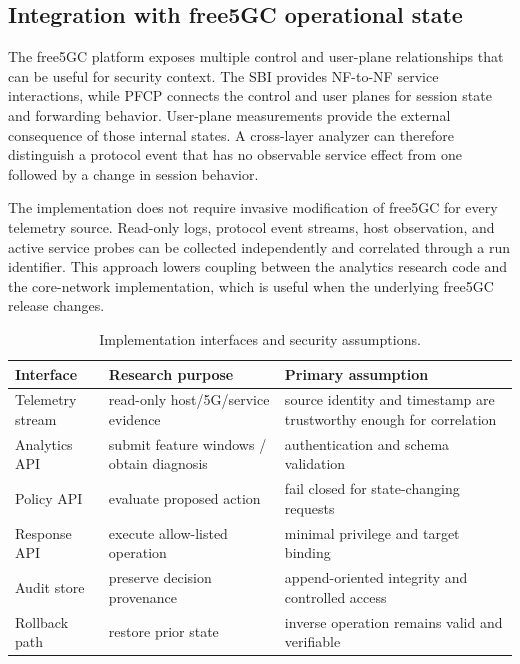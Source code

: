 \documentclass[sigconf,review]{acmart}
\begin{document}
\subsection{Integration with free5GC operational state}
The free5GC platform exposes multiple control and user-plane relationships that can be useful for security context. The SBI provides NF-to-NF service interactions, while PFCP connects the control and user planes for session state and forwarding behavior. User-plane measurements provide the external consequence of those internal states. A cross-layer analyzer can therefore distinguish a protocol event that has no observable service effect from one followed by a change in session behavior.

The implementation does not require invasive modification of free5GC for every telemetry source. Read-only logs, protocol event streams, host observation, and active service probes can be collected independently and correlated through a run identifier. This approach lowers coupling between the analytics research code and the core-network implementation, which is useful when the underlying free5GC release changes.

\begin{table}[t]
\caption{Implementation interfaces and security assumptions.}
\label{tab:interfaces}
\centering\scriptsize
\setlength{\tabcolsep}{2.5pt}
\renewcommand{\arraystretch}{1.08}
\begin{tabularx}{\columnwidth}{>{\raggedright\arraybackslash}p{} X X}
\toprule
Interface & Research purpose & Primary assumption \\
\midrule
Telemetry stream & read-only host/5G/service evidence & source identity and timestamp are trustworthy enough for correlation \\
Analytics API & submit feature windows / obtain diagnosis & authentication and schema validation \\
Policy API & evaluate proposed action & fail closed for state-changing requests \\
Response API & execute allow-listed operation & minimal privilege and target binding \\
Audit store & preserve decision provenance & append-oriented integrity and controlled access \\
Rollback path & restore prior state & inverse operation remains valid and verifiable \\
\bottomrule
\end{tabularx}
\end{table}
\end{document}
